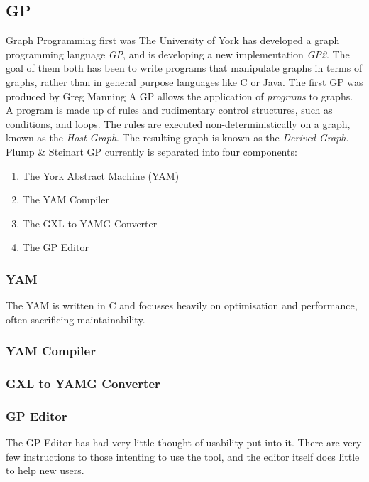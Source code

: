 \documentclass{UoYCSproject}
\begin{document}
\subsection{GP}
Graph Programming first was %
The University of York has developed a graph programming language \emph{GP}, and is developing a new implementation \emph{GP2}. The goal of them both has been to write programs that manipulate graphs in terms of graphs, rather than in general purpose languages like C or Java. The first GP was produced by Greg Manning %
A GP allows the application of \emph{programs} to graphs. A program is made up of rules and rudimentary control structures, such as conditions, and loops. The rules are executed non-deterministically on a graph, known as the \emph{Host Graph}. The resulting graph is known as the \emph{Derived Graph}.
Plump \& Steinart
GP currently is separated into four components:
\begin{enumerate}
  \item The York Abstract Machine (YAM)
  \item The YAM Compiler
  \item The GXL to YAMG Converter
  \item The GP Editor
\end{enumerate}
\subsubsection{YAM}
The YAM is written in C and focusses heavily on optimisation and performance, often sacrificing maintainability. 
\subsubsection{YAM Compiler}

\subsubsection{GXL to YAMG Converter}
\subsubsection{GP Editor}
The GP Editor has had very little thought of usability put into it. There are very few instructions to those intenting to use the tool, and the editor itself does little to help new users.
\end{document}
